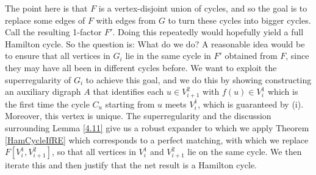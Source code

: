 \documentclass[10pt,letterpaper, reqno]{amsart}
\theoremstyle{definition}
\numberwithin{equation}{section}
\begin{document}
\noindent The point here is that $F$ is a vertex-disjoint union of cycles, and so the goal is to replace some edges of $F$ with edges from $G$ to turn these cycles into bigger cycles. Call the resulting 1-factor $F'$. Doing this repeatedly would hopefully yield a full Hamilton cycle. So the question is: What do we do? A reasonable idea would be to ensure that all vertices in $G_i$ lie in the same cycle in $F'$ obtained from $F$, since they may have all been in different cycles before. We want to exploit the superregularity of $G_i$ to achieve this goal, and we do this by showing constructing an auxiliary digraph $A$ that identifies each $u \in V^2_{i+1}$ with $f(u) \in V^1_{i}$ which is the first time the cycle $C_u$ starting from $u$ meets $V_i^1$, which is guaranteed by (i). Moreover, this vertex is unique. The superregularity and the discussion surrounding Lemma \ref{4.11} give us a robust expander to which we apply Theorem \ref{HamCycleIfRE} which corresponds to a perfect matching, with which we replace $F[V_i^1, V_{i+1}^2]$, so that all vertices in $V^1_i$ and $V^2_{i+1}$ lie on the same cycle. We then iterate this and then justify that the net result is a Hamilton cycle.
\end{document}
